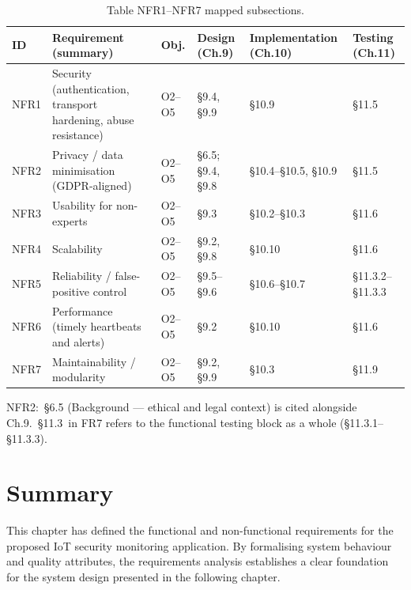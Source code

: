 \begin{table}[htbp]
  \centering
  \small
  \caption{Table  NFR1--NFR7 mapped subsections.}
  \label{tab:ica2_6}
\begin{tabular}{p{}p{}p{}p{}p{}p{}}
\toprule
ID & Requirement (summary) & Obj. & Design (Ch.9) & Implementation (Ch.10) & Testing (Ch.11) \\
\midrule
NFR1 & Security (authentication, transport hardening, abuse resistance) & O2--O5 & \S{}9.4, \S{}9.9 & \S{}10.9 & \S{}11.5 \\
NFR2 & Privacy / data minimisation (GDPR-aligned) & O2--O5 & \S{}6.5; \S{}9.4, \S{}9.8 & \S{}10.4--\S{}10.5, \S{}10.9 & \S{}11.5 \\
NFR3 & Usability for non-experts & O2--O5 & \S{}9.3 & \S{}10.2--\S{}10.3 & \S{}11.6 \\
NFR4 & Scalability & O2--O5 & \S{}9.2, \S{}9.8 & \S{}10.10 & \S{}11.6 \\
NFR5 & Reliability / false-positive control & O2--O5 & \S{}9.5--\S{}9.6 & \S{}10.6--\S{}10.7 & \S{}11.3.2--\S{}11.3.3 \\
NFR6 & Performance (timely heartbeats and alerts) & O2--O5 & \S{}9.2 & \S{}10.10 & \S{}11.6 \\
NFR7 & Maintainability / modularity & O2--O5 & \S{}9.2, \S{}9.9 & \S{}10.3 & \S{}11.9 \\
\bottomrule
\end{tabular}
\end{table}

NFR2:~\S{}6.5 (Background --- ethical and legal context) is cited alongside Ch.9.~\S{}11.3~in FR7 refers to the functional testing block as a whole (\S{}11.3.1--\S{}11.3.3).

\section{Summary}

This chapter has defined the functional and non-functional requirements for the proposed IoT security monitoring application. By formalising system behaviour and quality attributes, the requirements analysis establishes a clear foundation for the system design presented in the following chapter.
